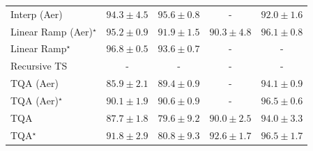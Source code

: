 \begin{tabular}{l|cccc|}
Interp (Aer) & {\cellcolor[HTML]{BE4503}} \color[HTML]{F1F1F1} $94.3\pm 4.5$ & {\cellcolor[HTML]{A63A03}} \color[HTML]{F1F1F1} $95.6\pm 0.8$ & {\cellcolor[HTML]{000000}} \color[HTML]{F1F1F1} {\cellcolor{white}} \color{black} - & {\cellcolor[HTML]{DE610C}} \color[HTML]{F1F1F1} $92.0\pm 1.6$ \\
Linear Ramp (Aer)$^\star$ & {\cellcolor[HTML]{AE3E03}} \color[HTML]{F1F1F1} $95.2\pm 0.9$ & {\cellcolor[HTML]{E0630D}} \color[HTML]{F1F1F1} $91.9\pm 1.5$ & {\cellcolor[HTML]{F07919}} \color[HTML]{F1F1F1} $90.3\pm 4.8$ & {\cellcolor[HTML]{9C3604}} \color[HTML]{F1F1F1} $96.1\pm 0.8$ \\
Linear Ramp$^\star$ & {\cellcolor[HTML]{903104}} \color[HTML]{F1F1F1} $96.8\pm 0.5$ & {\cellcolor[HTML]{CC4C02}} \color[HTML]{F1F1F1} $93.6\pm 0.7$ & {\cellcolor[HTML]{000000}} \color[HTML]{F1F1F1} {\cellcolor{white}} \color{black} - & {\cellcolor[HTML]{000000}} \color[HTML]{F1F1F1} {\cellcolor{white}} \color{black} - \\
Recursive TS & {\cellcolor[HTML]{000000}} \color[HTML]{F1F1F1} {\cellcolor{white}} \color{black} - & {\cellcolor[HTML]{000000}} \color[HTML]{F1F1F1} {\cellcolor{white}} \color{black} - & {\cellcolor[HTML]{000000}} \color[HTML]{F1F1F1} {\cellcolor{white}} \color{black} - & {\cellcolor[HTML]{000000}} \color[HTML]{F1F1F1} {\cellcolor{white}} \color{black} - \\
TQA (Aer) & {\cellcolor[HTML]{FEBE4A}} \color[HTML]{000000} $85.9\pm 2.1$ & {\cellcolor[HTML]{F6861F}} \color[HTML]{F1F1F1} $89.4\pm 0.9$ & {\cellcolor[HTML]{000000}} \color[HTML]{F1F1F1} {\cellcolor{white}} \color{black} - & {\cellcolor[HTML]{C34802}} \color[HTML]{F1F1F1} $94.1\pm 0.9$ \\
TQA (Aer)$^\star$ & {\cellcolor[HTML]{F17C1A}} \color[HTML]{F1F1F1} $90.1\pm 1.9$ & {\cellcolor[HTML]{EE7416}} \color[HTML]{F1F1F1} $90.6\pm 0.9$ & {\cellcolor[HTML]{000000}} \color[HTML]{F1F1F1} {\cellcolor{white}} \color{black} - & {\cellcolor[HTML]{943304}} \color[HTML]{F1F1F1} $96.5\pm 0.6$ \\
TQA & {\cellcolor[HTML]{FEA030}} \color[HTML]{000000} $87.7\pm 1.8$ & {\cellcolor[HTML]{FFF8C4}} \color[HTML]{000000} $79.6\pm 9.2$ & {\cellcolor[HTML]{F27D1B}} \color[HTML]{F1F1F1} $90.0\pm 2.5$ & {\cellcolor[HTML]{C44802}} \color[HTML]{F1F1F1} $94.0\pm 3.3$ \\
TQA$^\star$ & {\cellcolor[HTML]{E1640E}} \color[HTML]{F1F1F1} $91.8\pm 2.9$ & {\cellcolor[HTML]{FFF2B1}} \color[HTML]{000000} $80.8\pm 9.3$ & {\cellcolor[HTML]{D75908}} \color[HTML]{F1F1F1} $92.6\pm 1.7$ & {\cellcolor[HTML]{943304}} \color[HTML]{F1F1F1} $96.5\pm 1.7$ \\

\end{tabular}
